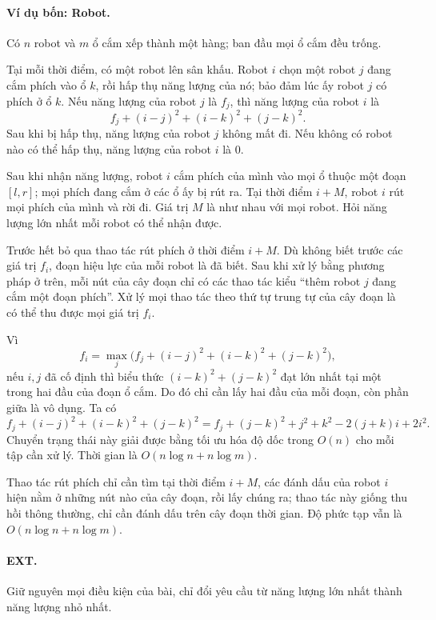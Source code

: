 \documentclass[11pt]{article}
\begin{document}
\paragraph{Ví dụ bốn: Robot.}
Có \(n\) robot và \(m\) ổ cắm xếp thành một hàng; ban đầu mọi ổ cắm đều trống.

Tại mỗi thời điểm, có một robot lên sân khấu. Robot \(i\) chọn một robot \(j\)
đang cắm phích vào ổ \(k\), rồi hấp thụ năng lượng của nó; bảo đảm lúc ấy
robot \(j\) có phích ở ổ \(k\). Nếu năng lượng của robot \(j\) là \(f_j\), thì
năng lượng của robot \(i\) là
\[
  f_j+(i-j)^2+(i-k)^2+(j-k)^2.
\]
Sau khi bị hấp thụ, năng lượng của robot \(j\) không mất đi. Nếu không có
robot nào có thể hấp thụ, năng lượng của robot \(i\) là \(0\).

Sau khi nhận năng lượng, robot \(i\) cắm phích của mình vào mọi ổ thuộc một
đoạn \([l,r]\); mọi phích đang cắm ở các ổ ấy bị rút ra. Tại thời điểm
\(i+M\), robot \(i\) rút mọi phích của mình và rời đi. Giá trị \(M\) là như
nhau với mọi robot. Hỏi năng lượng lớn nhất mỗi robot có thể nhận được.

Trước hết bỏ qua thao tác rút phích ở thời điểm \(i+M\). Dù không biết trước
các giá trị \(f_i\), đoạn hiệu lực của mỗi robot là đã biết. Sau khi xử lý bằng
phương pháp ở trên, mỗi nút của cây đoạn chỉ có các thao tác kiểu ``thêm robot
\(j\) đang cắm một đoạn phích''. Xử lý mọi thao tác theo thứ tự trung tự của
cây đoạn là có thể thu được mọi giá trị \(f_i\).

Vì
\[
  f_i=\max_j\bigl(f_j+(i-j)^2+(i-k)^2+(j-k)^2\bigr),
\]
nếu \(i,j\) đã cố định thì biểu thức \((i-k)^2+(j-k)^2\) đạt lớn nhất tại một
trong hai đầu của đoạn ổ cắm. Do đó chỉ cần lấy hai đầu của mỗi đoạn, còn phần
giữa là vô dụng. Ta có
\[
  f_j+(i-j)^2+(i-k)^2+(j-k)^2
  =f_j+(j-k)^2+j^2+k^2-2(j+k)i+2i^2.
\]
Chuyển trạng thái này giải được bằng tối ưu hóa độ dốc trong \(O(n)\) cho mỗi
tập cần xử lý. Thời gian là \(O(n\log n+n\log m)\).

Thao tác rút phích chỉ cần tìm tại thời điểm \(i+M\), các đánh dấu của robot
\(i\) hiện nằm ở những nút nào của cây đoạn, rồi lấy chúng ra; thao tác này
giống thu hồi thông thường, chỉ cần đánh dấu trên cây đoạn thời gian. Độ phức
tạp vẫn là \(O(n\log n+n\log m)\).

\paragraph{EXT.}
Giữ nguyên mọi điều kiện của bài, chỉ đổi yêu cầu từ năng lượng lớn nhất thành
năng lượng nhỏ nhất.
\end{document}
